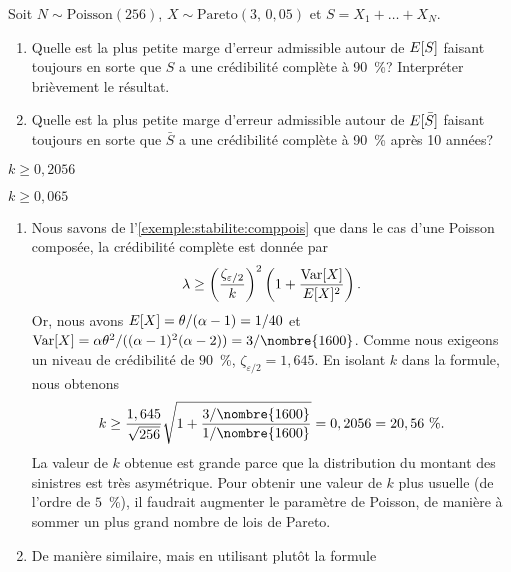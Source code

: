 \begin{exercice}
  Soit $N \sim \text{Poisson}(256)$, $X \sim \text{Pareto}(3,\, 0,05)$
  et $S = X_1 + \dots + X_N$.
  \begin{enumerate}
  \item Quelle est la plus petite marge d'erreur admissible autour de
    $E [ S ]$ faisant toujours en sorte que $S$ a une crédibilité
    complète à 90~\%?  Interpréter brièvement le résultat.
  \item Quelle est la plus petite marge d'erreur admissible autour de
    $E [ \bar{S} ]$ faisant toujours en sorte que $\bar{S}$ a une
    crédibilité complète à 90~\% après 10 années?
  \end{enumerate}
  \begin{rep}
    \begin{inparaenum}
    \item $k \geq 0,2056$
    \item $k \geq 0,065$
    \end{inparaenum}
  \end{rep}
  \begin{sol}
    \begin{enumerate}
    \item Nous savons de l'\autoref{exemple:stabilite:comppois} que
      dans le cas d'une Poisson composée, la crédibilité complète est
      donnée par
      \begin{displaymath}
        \lambda \geq
        \left(
          \frac{\zeta_{\varepsilon/2}}{k}
        \right)^2
        \left(
          1 + \frac{\operatorname{Var} [ X ]}{E [ X ]^2}
        \right).
      \end{displaymath}
      Or, nous avons $E [ X ] = \theta/(\alpha - 1) = 1/40$ et
      $\var{X} = \alpha \theta^2/((\alpha - 1)^2(\alpha - 2)) =
      3/\nombre{1600}$. Comme nous exigeons un niveau de crédibilité
      de $90$~\%, $\zeta_{\varepsilon/2} = 1,645$. En isolant $k$ dans
      la formule, nous obtenons
      \begin{displaymath}
        k \ge
        \frac{1,645}{\sqrt{256}}
        \sqrt{1 + \frac{3/\nombre{1600}}{1/\nombre{1600}}} =
        0,2056 = 20,56~\%.
      \end{displaymath}
      La valeur de $k$ obtenue est grande parce que la
      distribution du montant des sinistres est très asymétrique. Pour
      obtenir une valeur de $k$ plus usuelle (de l'ordre de $5$~\%),
      il faudrait augmenter le paramètre de Poisson, de manière à
      sommer un plus grand nombre de lois de Pareto.
    \item De manière similaire, mais en utilisant plutôt la formule

\end{enumerate}
\end{sol}
\end{exercice}
